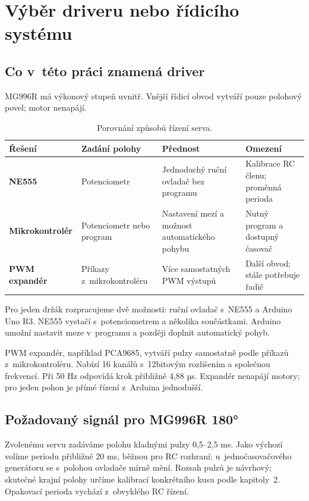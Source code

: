 \chapter{Výběr driveru nebo řídicího systému}
\section{Co v~této práci znamená driver}
MG996R má výkonový stupeň uvnitř. Vnější řídicí obvod vytváří pouze polohový povel; motor nenapájí.

\begin{table}[htbp]\centering\small
\caption{Porovnání způsobů řízení serva.}
\renewcommand{\arraystretch}{1.25}
\begin{tabularx}{\textwidth}{@{}>{\raggedright\arraybackslash}p{27mm}YYY@{}}\toprule
\textbf{Řešení} & \textbf{Zadání polohy} & \textbf{Přednost} & \textbf{Omezení}\\\midrule
\textbf{NE555} & Potenciometr & Jednoduchý ruční ovladač bez programu & Kalibrace RC členu; proměnná perioda\\\addlinespace[5pt]\midrule
\textbf{Mikrokontrolér} & Potenciometr nebo program & Nastavení mezí a možnost automatického pohybu & Nutný program a dostupný časovač\\\addlinespace[5pt]\midrule
\textbf{PWM expandér} & Příkazy z~mikrokontroléru & Více samostatných PWM výstupů & Další obvod; stále potřebuje řadič\\\bottomrule
\end{tabularx}
\end{table}

Pro jeden držák rozpracujeme dvě možnosti: ruční ovladač s~NE555 a Arduino Uno R3. NE555 vystačí s~potenciometrem a několika součástkami. Arduino umožní nastavit meze v~programu a později doplnit automatický pohyb.

PWM expandér, například PCA9685, vytváří pulzy samostatně podle příkazů z~mikrokontroléru. Nabízí 16 kanálů s~12bitovým rozlišením a společnou frekvencí. Při 50 Hz odpovídá krok přibližně 4,88 µs. Expandér nenapájí motory; pro jeden pohon je přímé řízení z~Arduina jednodušší.~\cite{pca}

\section{Požadovaný signál pro MG996R 180°}
Zvolenému servu zadáváme polohu kladnými pulzy 0,5--2,5 ms. Jako výchozí volíme periodu přibližně 20 ms, běžnou pro RC rozhraní; u~jednočasovačového generátoru se s~polohou ovladače mírně mění. Rozsah pulzů je návrhový; skutečné krajní polohy určíme kalibrací konkrétního kusu podle kapitoly~2. Opakovací perioda vychází z~obvyklého RC řízení.~\cite{pololu}

